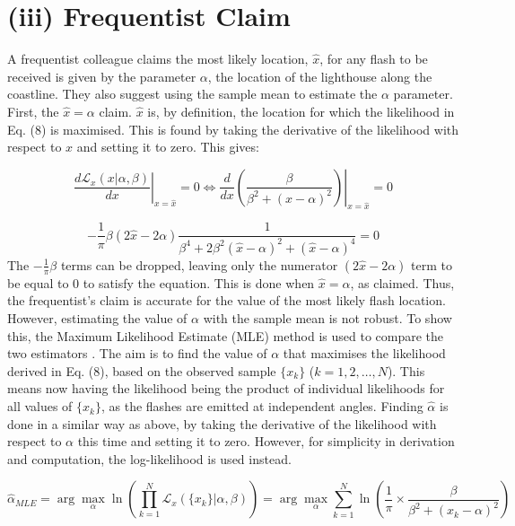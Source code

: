 \documentclass[12pt]{report} %
\begin{document}
\chapter{(iii) Frequentist Claim}

A frequentist colleague claims the most likely location, $\hat{x}$, for any flash to be received is given by the parameter $\alpha$, the location of the lighthouse along the coastline. They also suggest using the sample mean to estimate the $\alpha$ parameter. First, the $\hat{x} = \alpha$ claim. $\hat{x}$ is, by definition, the location for which the likelihood in Eq. (8) is maximised. This is found by taking the derivative of the likelihood with respect to $x$ and setting it to zero. This gives:

\begin{equation}
    \left. \frac{d\mathcal{L}_{x}(x|\alpha, \beta)}{dx} \right|_{x = \hat{x}} = 0 \iff \left. \frac{d}{dx} \left(\frac{\beta}{\beta^{2} + (x - \alpha)^{2}}\right) \right|_{x = \hat{x}} = 0
\end{equation}

\begin{equation}
    -\frac{1}{\pi} \beta (2\hat{x} - 2\alpha)\frac{1}{\beta^{4} + 2\beta^{2}(\hat{x} - \alpha)^{2} + (\hat{x} - \alpha)^{4}} = 0
\end{equation}
\newline
The $-\frac{1}{\pi} \beta$ terms can be dropped, leaving only the numerator $(2\hat{x} - 2\alpha)$ term to be equal to 0 to satisfy the equation. This is done when $\hat{x} = \alpha$, as claimed. Thus, the frequentist's claim is accurate for the value of the most likely flash location. However, estimating the value of $\alpha$ with the sample mean is not robust. To show this, the Maximum Likelihood Estimate (MLE) method is used to compare the two estimators \cite[pp 135-137]{FJames2006}. The aim is to find the value of $\alpha$ that maximises the likelihood derived in Eq. (8), based on the observed sample $\{x_k\}$ ($k = 1, 2,\dots, N$). This means now having the likelihood being the product of individual likelihoods for all values of $\{x_k\}$, as the flashes are emitted at independent angles. Finding $\hat{\alpha}$ is done in a similar way as above, by taking the derivative of the likelihood with respect to $\alpha$ this time and setting it to zero. However, for simplicity in derivation and computation, the log-likelihood is used instead.

\begin{equation}
    \hat{\alpha}_{MLE} = \arg \max_{\alpha} \ln(\prod_{k=1}^{N}  \mathcal{L}_{x}(\{x_{k}\}|\alpha, \beta)) = \arg \max_{\alpha} \sum_{k=1}^{N} \ln(\frac{1}{\pi} \times \frac{\beta}{\beta^{2} + (x_{k} - \alpha)^{2}})
\end{equation}
\end{document}
